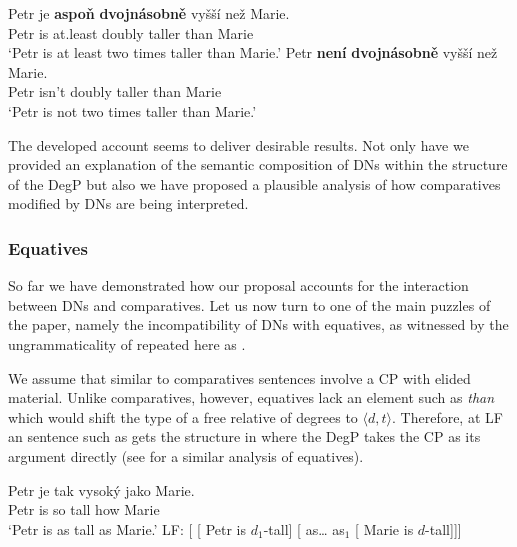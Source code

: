 \documentclass[output=paper,modfonts,hidelinks,newtxmath
\ChapterDOI{10.5281/zenodo.2545513}
]{langscibook}
\begin{document}
\ea \ea \gll\label{aspon}Petr je \textbf{aspoň} \textbf{dvojnásobně} vyšší než Marie.\label{comp-at-least}\\
Petr is at.least doubly taller than Marie\\
\glt `Petr is at least two times taller than Marie.'
\ex \gll \label{neni}Petr \textbf{není} \textbf{dvojnásobně} vyšší než Marie.\\
Petr isn't doubly taller than Marie\\
\glt `Petr is not two times taller than Marie.'
\z \z

\noindent The developed account seems to deliver desirable results. Not only have we provided an explanation of the semantic composition of DNs within the structure of the DegP but also we have proposed a plausible analysis of how comparatives modified by DNs are being interpreted.

\subsubsection{Equatives}\label{equatives}

So far we have demonstrated how our proposal accounts for the interaction between DNs and comparatives. Let us now turn to one of the main puzzles of the paper, namely the incompatibility of DNs with equatives, as witnessed by the ungrammaticality of  repeated here as .

\z

\noindent We assume that similar to comparatives  sentences involve a CP with elided material. Unlike comparatives, however, equatives lack an element such as \textit{than} which would shift the type of a free relative of degrees to $\langle d,t\rangle$. Therefore, at LF an  sentence such as  gets the structure in  where the DegP takes the CP as its argument directly (see \citealt{gobeski_morzycki2017percentages} for a similar analysis of equatives).

\ea \ea \gll Petr je tak vysoký jako Marie.\label{eq}\\
Petr is so tall how Marie\\
\glt `Petr is as tall as Marie.'
\ex LF: [ [ Petr is $d_1$-tall] [ as\dots{} as$_1$ [ Marie is $d$-tall]]]\label{eq-LF}
\z \z
\end{document}
